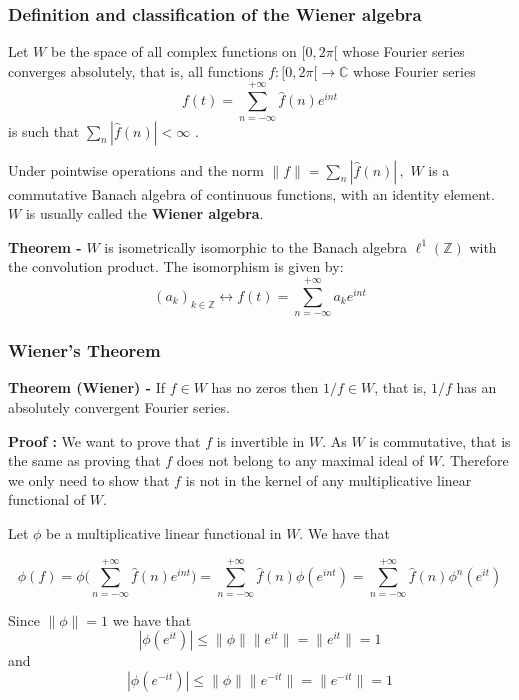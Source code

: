 \documentclass[12pt]{article}
\begin{document}
\subsubsection{Definition and classification of the Wiener algebra}
Let $W$ be the space of all complex functions on $[0,2\pi[$ whose Fourier series converges
 absolutely, that is, all functions $f:[0,2\pi[ \longrightarrow \mathbb{C}$ whose Fourier series
\begin{displaymath}
f(t)= \sum_{n=-\infty}^{+\infty} \hat{f}(n)e^{int}
\end{displaymath}
is such that $\sum_{n} |\hat{f}(n)| < \infty$ .

Under pointwise operations and the norm $\|f \| = \sum_{n} |\hat{f}(n)|\,,$ $W$ is a commutative Banach
 algebra of continuous functions, with an identity element. $W$ is usually called the {\bf Wiener algebra}.

{\bf Theorem -} $W$ is isometrically isomorphic to the Banach algebra $\ell^1(\mathbb{Z})$ with the
 convolution product. The isomorphism is given by:
\begin{displaymath}
(a_k)_{k \in \mathbb{Z}} \longleftrightarrow f(t) = \sum_{n=-\infty}^{+\infty} a_k e^{int}
\end{displaymath}

\subsubsection{Wiener's Theorem}

{\bf Theorem (Wiener) -} If $f \in W$ has no zeros then $1/f \in W$, that is, $1/f$ has an
 absolutely convergent Fourier series.

{\bf Proof :} We want to prove that $f$ is invertible in $W$. As $W$ is commutative, that is the same as proving
 that $f$ does not belong to any maximal ideal of $W$. Therefore we only need to show that $f$ is not in the
 kernel of any multiplicative linear functional of $W$.

Let $\phi$ be a multiplicative linear functional in $W$. We have that

\begin{displaymath}
\phi (f)= \phi \Big( \sum_{n=-\infty}^{+\infty} \hat{f}(n)e^{int} \Big) = \sum_{n=-\infty}^{+\infty} \hat{f}(n)\phi (e^{int}) = \sum_{n=-\infty}^{+\infty} \hat{f}(n)\phi^n (e^{it})
\end{displaymath}

Since $\|\phi\|=1$ we have that
\begin{displaymath}
|\phi (e^{it})| \le \|\phi\|\|e^{it}\|=\|e^{it}\|=1
\end{displaymath}
and
\begin{displaymath}
|\phi (e^{-it})| \le \|\phi\|\|e^{-it}\|=\|e^{-it}\|=1
\end{displaymath}
\end{document}
